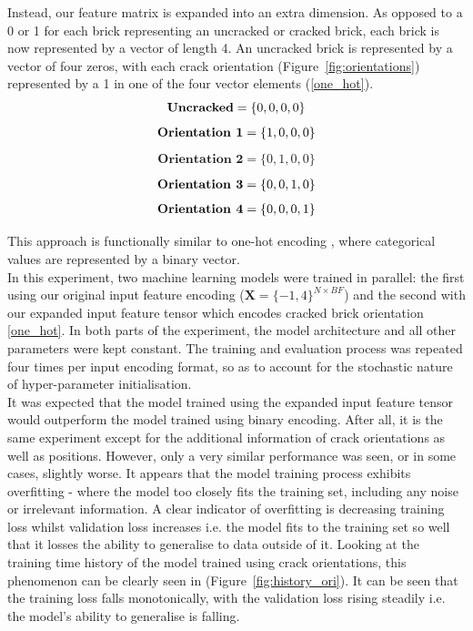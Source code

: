\noindent
Instead, our feature matrix is expanded into an extra dimension. As opposed to a 0 or 1 for each brick representing an uncracked or cracked brick, each brick is now represented by a vector of length 4. An uncracked brick is represented by a vector of four zeros, with each crack orientation (Figure~\ref{fig:orientations}) represented by a 1 in one of the four vector elements (\ref{one_hot}).
\\

\begin{equation} \label{one_hot}
	\textbf{Uncracked} = \{0, 0, 0, 0\}  \notag
\end{equation}
\begin{gather}
	\textbf{Orientation 1} = \{1, 0, 0, 0\}  \notag
\end{gather}
\begin{align}
	\textbf{Orientation 2} = \{0, 1, 0, 0\} 
\end{align}
\begin{align}
	\textbf{Orientation 3} = \{0, 0, 1, 0\}  \notag
\end{align}
\begin{align}
	\textbf{Orientation 4} = \{0, 0, 0, 1\}  \notag
\end{align}

\noindent This approach is functionally similar to one-hot encoding \cite{seger2018investigation}, where categorical values are represented by a binary vector. \\

\noindent
In this experiment, two machine learning models were trained in parallel: the first using our original input feature encoding ($\textbf{X} = \{-1, 4\}^{N \times BF}$) and the second with our expanded input feature tensor which encodes cracked brick orientation \ref{one_hot}. In both parts of the experiment, the model architecture and all other parameters were kept constant.  The training and evaluation process was repeated four times per input encoding format, so as to account for the stochastic nature of hyper-parameter initialisation. 
\\

\noindent It was expected that the model trained using the expanded input feature tensor would outperform  the model trained using binary encoding.  After all, it is the same experiment except for the additional information of crack orientations as well as positions. However, only a very similar performance was seen, or in some cases, slightly worse. It appears that the model training process exhibits overfitting - where the model too closely fits the training set, including any noise or irrelevant information.  A clear indicator of overfitting is decreasing training loss whilst validation loss increases i.e. the model fits to the training set so well that it losses the ability to generalise to data outside of it. Looking at the training time history of the model trained using crack orientations, this phenomenon can be clearly seen in (Figure~\ref{fig:history_ori}). It can be seen that the training loss falls monotonically, with the validation loss rising steadily i.e. the model's ability to generalise is falling. \\

